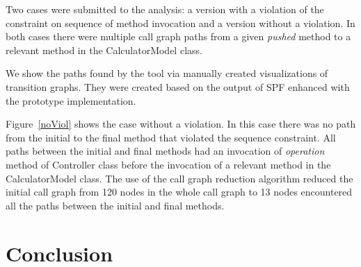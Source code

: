 \documentclass{acm_proc_article-sp}
\begin{document}
Two cases were submitted to the analysis: a version with a violation of the constraint on sequence of method invocation and a version without a violation. In both cases there were multiple call graph paths from a given {\it pushed} method to a relevant method in the CalculatorModel class.

We show the paths found by the tool via manually created visualizations of transition graphs. They were created based on the output of SPF enhanced with the prototype implementation.



Figure~\ref{noViol} shows the case without a violation. In this case there was no path from the initial to the final method that violated the sequence constraint. All paths between the initial and final methods had an invocation of {\it operation} method of Controller class before the invocation of a relevant method in the CalculatorModel class.
The use of the call graph reduction algorithm reduced the initial call graph from 120 nodes in the whole call graph to 13 nodes encountered all the paths between the initial and final methods.


\section{Conclusion}
\label{sec:conclusion}
\end{document}
